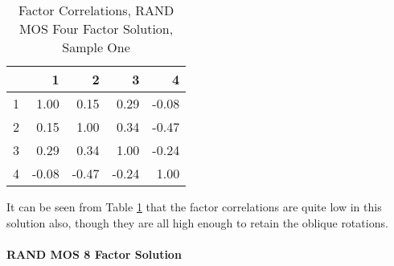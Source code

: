 \documentclass{article}
\begin{document}
\begin{table}[ht]
\centering
\begin{tabular}{rrrrr}
  \hline
 & 1 & 2 & 3 & 4 \\ 
  \hline
1 & 1.00 & 0.15 & 0.29 & -0.08 \\ 
  2 & 0.15 & 1.00 & 0.34 & -0.47 \\ 
  3 & 0.29 & 0.34 & 1.00 & -0.24 \\ 
  4 & -0.08 & -0.47 & -0.24 & 1.00 \\ 
   \hline
\end{tabular}
\caption{Factor Correlations, RAND MOS Four Factor Solution, Sample One} 
\label{tab:tcq1rand4corr}
\end{table}
It can be seen from Table \ref{tab:tcq1rand4corr} that the factor correlations are quite low in this solution also, though they are all high enough to retain the oblique rotations.




\paragraph{RAND MOS 8 Factor Solution}
\end{document}

